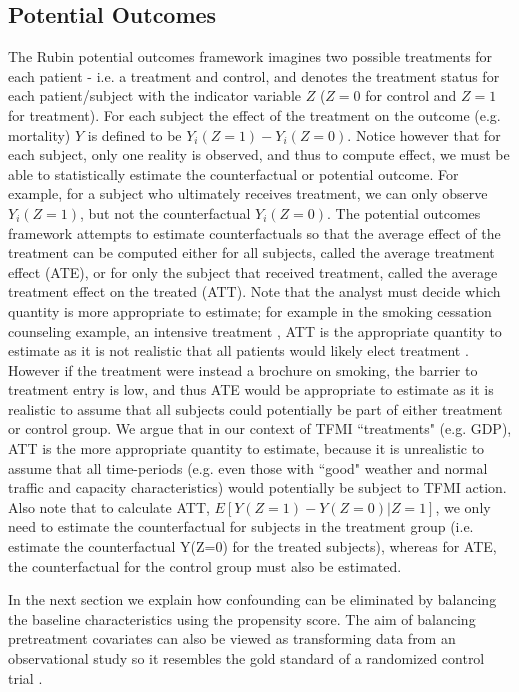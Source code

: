 {\subsection{Potential Outcomes}
The Rubin potential outcomes framework \cite{rubin1974estimating} imagines two possible treatments for each patient - i.e. a treatment and control, and denotes the treatment status for each patient/subject with the indicator variable $Z$ ($Z=0$ for control and $Z=1$ for treatment).  For each subject the effect of the treatment on the outcome (e.g. mortality) $Y$ is defined to be $Y_i(Z=1) - Y_i(Z=0)$.  Notice however that for each subject, only one reality is observed, and thus to compute effect, we must be able to statistically estimate the counterfactual or potential outcome.  For example, for a subject who ultimately receives treatment, we can only observe $Y_i(Z=1)$, but not the counterfactual $Y_i(Z=0)$.  The potential outcomes framework attempts to estimate counterfactuals so that the average effect of the treatment can be computed either for all subjects, called the average treatment effect (ATE),  or for only the subject that received treatment, called the average treatment effect on the treated (ATT).  Note that the analyst must decide which quantity is more appropriate to estimate; for example in the smoking cessation counseling example, an intensive treatment , ATT is the appropriate quantity to estimate as it is not realistic that all patients would likely elect treatment \cite{austin2011tutorial}.  However if the treatment were instead a brochure on smoking, the barrier to treatment entry is low, and thus ATE would be appropriate to estimate as it is realistic to assume that all subjects could potentially be part of either treatment or control group.  We argue  that in our context of TFMI ``treatments" (e.g. GDP), ATT is the more appropriate quantity to estimate, because it is unrealistic to assume that all time-periods (e.g. even those with ``good" weather and normal traffic and capacity characteristics) would potentially be subject to TFMI action.  Also note that to calculate ATT, $E[Y(Z=1) - Y(Z=0)| Z=1]$, we only need to estimate the counterfactual for subjects in the treatment group (i.e. estimate the counterfactual Y(Z=0) for the treated subjects), whereas for ATE, the counterfactual for the control group must also be estimated.  

In the next section we explain how confounding can be eliminated by balancing the baseline characteristics using the propensity score.  The aim of balancing pretreatment covariates can also be viewed as transforming data from an observational study so it resembles the gold standard of a randomized control trial \cite{austin2011introduction}.  

}
